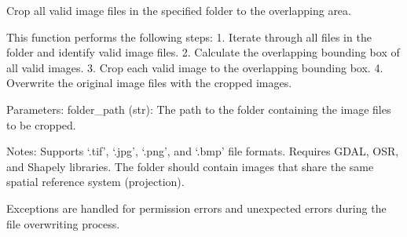 \documentclass[letterpaper,10pt,english]{sphinxmanual}
\begin{document}

\begin{fulllineitems}
\label{\detokenize{akhdefo_functions:akhdefo_functions.Akhdefo_utils.crop_to_overlap}}
\pysigstartsignatures
{}
\pysigstopsignatures
\sphinxAtStartPar
Crop all valid image files in the specified folder to the overlapping area.

\sphinxAtStartPar
This function performs the following steps:
1. Iterate through all files in the folder and identify valid image files.
2. Calculate the overlapping bounding box of all valid images.
3. Crop each valid image to the overlapping bounding box.
4. Overwrite the original image files with the cropped images.

\sphinxAtStartPar
Parameters:
\sphinxhyphen{} folder\_path (str): The path to the folder containing the image files to be cropped.

\sphinxAtStartPar
Notes:
\sphinxhyphen{} Supports ‘.tif’, ‘.jpg’, ‘.png’, and ‘.bmp’ file formats.
\sphinxhyphen{} Requires GDAL, OSR, and Shapely libraries.
\sphinxhyphen{} The folder should contain images that share the same spatial reference system (projection).

\sphinxAtStartPar
Exceptions are handled for permission errors and unexpected errors during the file overwriting process.

\end{fulllineitems}

\end{document}
